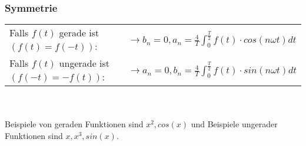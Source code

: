 \subsubsection{Symmetrie}
\begin{tabular}{ll}
  Falls $f(t)$ gerade ist $(f(t) = f(-t))$: &\ $\rightarrow b_{n} = 0, a_{n} = \frac{4}{T}\int_{0}^{\frac{T}{2}} f(t) \cdot cos(n \omega t)dt$\\
  Falls $f(t)$ ungerade ist $(f(-t) = -f(t))$: &\ $\rightarrow a_{n} = 0, b_{n} = \frac{4}{T}\int_{0}^{\frac{T}{2}} f(t) \cdot sin(n \omega t)dt$\\
\end{tabular}\\\\
Beispiele von geraden Funktionen sind $x^2, cos(x)$ und Beispiele ungerader Funktionen sind $x, x^3, sin(x)$.
